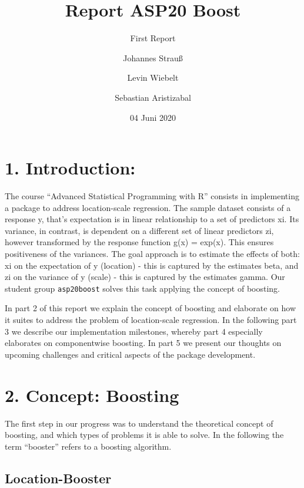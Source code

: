 \documentclass[
]{report}
\title{Report ASP20 Boost}
\subtitle{First Report}
\author{Johannes Strauß \and Levin Wiebelt \and Sebastian Aristizabal}
\date{04 Juni 2020}
\begin{document}
\maketitle

{
\setcounter{tocdepth}{1}
\tableofcontents
}
\hypertarget{introduction}{%
\chapter{1. Introduction:}\label{introduction}}

The course ``Advanced Statistical Programming with R'' consists in
implementing a package to address location-scale regression. The sample
dataset consists of a response y, that's expectation is in linear
relationship to a set of predictors xi. Its variance, in contrast, is
dependent on a different set of linear predictors zi, however
transformed by the response function g(x) = exp(x). This ensures
positiveness of the variances. The goal approach is to estimate the
effects of both: xi on the expectation of y (location) - this is
captured by the estimates beta, and zi on the variance of y (scale) -
this is captured by the estimates gamma. Our student group
\texttt{asp20boost} solves this task applying the concept of boosting.

In part 2 of this report we explain the concept of boosting and
elaborate on how it suites to address the problem of location-scale
regression. In the following part 3 we describe our implementation
milestones, whereby part 4 especially elaborates on componentwise
boosting. In part 5 we present our thoughts on upcoming challenges and
critical aspects of the package development.

\hypertarget{concept-boosting}{%
\chapter{2. Concept: Boosting}\label{concept-boosting}}

The first step in our progress was to understand the theoretical concept
of boosting, and which types of problems it is able to solve. In the
following the term ``booster'' refers to a boosting algorithm.

\hypertarget{location-booster}{%
\section{Location-Booster}\label{location-booster}}
\end{document}
